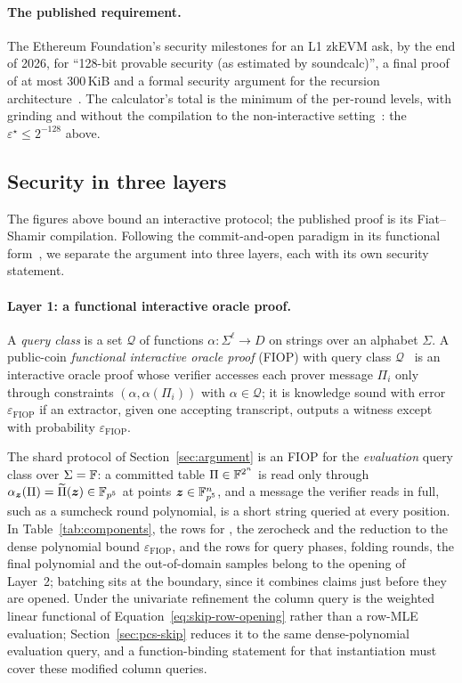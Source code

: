 \paragraph{The published requirement.} The Ethereum Foundation's security milestones for an L1 zkEVM ask, by the end of 2026, for ``128-bit provable security (as estimated by soundcalc)'', a final proof of at most 300\,KiB and a formal security argument for the recursion architecture~\citep{ef-security-foundations}. The calculator's total is the minimum of the per-round levels, with grinding and without the compilation to the non-interactive setting~\citep{soundcalc}: the $\varepsilon^\star \le 2^{-128}$ above.

\subsection{Security in three layers}
\label{sec:iopp-layers}

The figures above bound an interactive protocol; the published proof is its Fiat--Shamir compilation. Following the commit-and-open paradigm in its functional form~\citep{funky26}, we separate the argument into three layers, each with its own security statement.

\paragraph{Layer 1: a functional interactive oracle proof.} A \emph{query class} is a set $\mathcal Q$ of functions $\alpha : \Sigma^{\ell} \to D$ on strings over an alphabet $\Sigma$. A public-coin \emph{functional interactive oracle proof} (FIOP) with query class $\mathcal Q$~\citep{funky26} is an interactive oracle proof whose verifier accesses each prover message $\Pi_i$ only through constraints $(\alpha, \alpha(\Pi_i))$ with $\alpha \in \mathcal Q$; it is knowledge sound with error $\varepsilon_{\mathrm{FIOP}}$ if an extractor, given one accepting transcript, outputs a witness except with probability $\varepsilon_{\mathrm{FIOP}}$.

The shard protocol of Section~\ref{sec:argument} is an FIOP for the \emph{evaluation} query class over $\Sigma = \mathbb{F}$: a committed table $\Pi \in \mathbb{F}^{2^n}$ is read only through $\alpha_{\bm z}(\Pi) = \widetilde\Pi(\bm z) \in \mathbb{F}_{p^5}$ at points $\bm z \in \mathbb{F}_{p^5}^{n}$, and a message the verifier reads in full, such as a sumcheck round polynomial, is a short string queried at every position. In Table~\ref{tab:components}, the rows for \LogUp{}, the zerocheck and the reduction to the dense polynomial bound $\varepsilon_{\mathrm{FIOP}}$, and the rows for query phases, folding rounds, the final polynomial and the out-of-domain samples belong to the opening of Layer~2; batching sits at the boundary, since it combines claims just before they are opened. Under the univariate refinement the column query is the weighted linear functional of Equation~\eqref{eq:skip-row-opening} rather than a row-MLE evaluation; Section~\ref{sec:pcs-skip} reduces it to the same dense-polynomial evaluation query, and a function-binding statement for that instantiation must cover these modified column queries.

